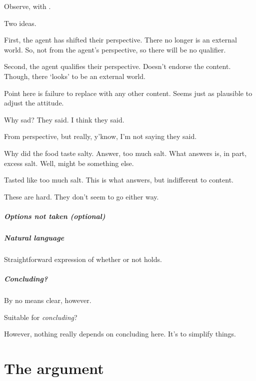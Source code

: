 \begin{note}
  Observe, with \citeauthor{Descartes:1996vp}.

  Two ideas.

  First, the agent has shifted their perspective.
  There no longer is an external world.
  So, not from the agent's perspective, so there will be no qualifier.

  Second, the agent qualifies their perspective.
  Doesn't endorse the content.
  Though, there `looks' to be an external world.
\end{note}

\begin{note}
  Point here is failure to replace with any other content.
  Seems just as plausible to adjust the attitude.
\end{note}

\begin{note}
  Why sad?
  They said.
  I think they said.

  From perspective, but really, y'know, I'm not saying they said.

  Why did the food taste salty.
  Answer, too much salt.
  What answers is, in part, excess salt.
  Well, might be something else.

  Tasted like too much salt.
  This is what answers, but indifferent to content.

  {
    \color{red}
    These are hard.
    They don't seem to go either way.
  }
\end{note}

\subparagraph{Options not taken (optional)}

\subparagraph{Natural language}

\begin{note}
  Straightforward expression of whether or not \ptivity{} holds.
\end{note}


\subparagraph{Concluding?}

\begin{note}
  By no means clear, however.

  Suitable for \emph{concluding}?
\end{note}

\begin{note}
  However, nothing really depends on concluding here.
  It's to simplify things.
\end{note}

\section{The argument}
\label{cha:zSpA:sec:the-argument}


